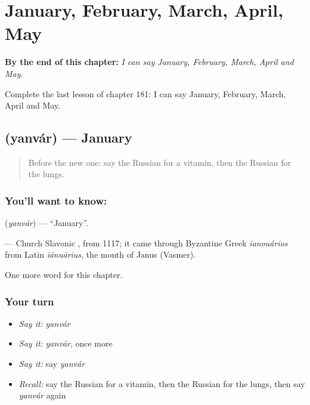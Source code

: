 
\chapter{January, February, March, April, May}
\label{ch:ru-january-february-march-april-may}

\begin{chapteropening}
\textbf{By the end of this chapter:} \emph{I can say January, February, March, April and May.}

Complete the last lesson of chapter 181: I can say January, February, March, April and May.
\end{chapteropening}

\section[\texorpdfstring{\ru{январь} (yanvár)}{январь (yanvár)}]{ (yanvár) — January}

\label{lesson:RU-C181-yanvar}



\begin{quote}
Before the new one: say the Russian for a vitamin, then the Russian for the lungs.
\end{quote}

\subsection*{You'll want to know: }
\textbf{} (\emph{yanvár}) — \textquotedblleft{}January\textquotedblright{}.

\begin{cousinweb}
\textbf{} — Church Slavonic \emph{}, from 1117; it came through Byzantine Greek \emph{ianouários} from Latin \emph{iānuārius}, the month of Janus (Vasmer).
\end{cousinweb}

\begin{grammarlens}[title={What you've built}]
One more word for this chapter.
\end{grammarlens}

\subsection*{Your turn}
\begin{itemize}
\raggedright
  \item \emph{Say it:} \emph{yanvár}
  \item \emph{Say it:} \emph{yanvár}, once more
  \item \emph{Say it:} say \emph{yanvár}
  \item \emph{Recall:} say the Russian for a vitamin, then the Russian for the lungs, then say \emph{yanvár} again
\end{itemize}

